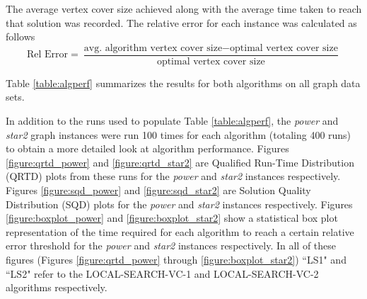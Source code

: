 \documentclass[sigconf]{acmart}
\begin{document}
The average vertex cover size achieved along with the average time taken to reach that solution was recorded. The relative error for each instance was calculated as follows
\begin{equation*}
	\textrm{Rel Error} = \frac{\textrm{avg. algorithm vertex cover size} - \textrm{optimal vertex cover size}}{\textrm{optimal vertex cover size}}
\end{equation*} 

Table \ref{table:algperf} summarizes the results for both algorithms on all graph data sets.

In addition to the runs used to populate Table \ref{table:algperf}, the \textit{power} and \textit{star2} graph instances were run 100 times for each algorithm (totaling 400 runs) to obtain a more detailed look at algorithm performance. Figures \ref{figure:qrtd_power} and \ref{figure:qrtd_star2} are Qualified Run-Time Distribution (QRTD) plots from these runs for the \textit{power} and \textit{star2} instances respectively. Figures \ref{figure:sqd_power} and \ref{figure:sqd_star2} are Solution Quality Distribution (SQD) plots for the \textit{power} and \textit{star2} instances respectively. Figures \ref{figure:boxplot_power} and \ref{figure:boxplot_star2} show a statistical box plot representation of the time required for each algorithm to reach a certain relative error threshold for the \textit{power} and \textit{star2} instances respectively. In all of these figures (Figures \ref{figure:qrtd_power} through \ref{figure:boxplot_star2}) ``LS1" and ``LS2" refer to the LOCAL-SEARCH-VC-1 and LOCAL-SEARCH-VC-2 algorithms respectively.
\end{document}
